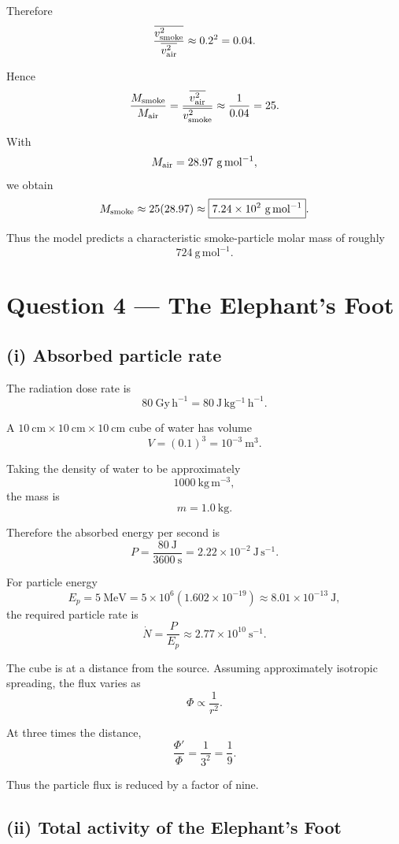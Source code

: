 \documentclass[11pt,a4paper]{article}
\begin{document}
Therefore
\[
\frac{\overline{v_{\rm smoke}^2}}
{\overline{v_{\rm air}^2}}
\approx0.2^2=0.04.
\]

Hence
\[
\frac{M_{\rm smoke}}{M_{\rm air}}
=
\frac{\overline{v_{\rm air}^2}}
{\overline{v_{\rm smoke}^2}}
\approx\frac1{0.04}=25.
\]

With
\[
M_{\rm air}=28.97\ \mathrm{g\,mol^{-1}},
\]
we obtain
\[
M_{\rm smoke}
\approx
25(28.97)
\approx
\boxed{7.24\times10^2\ \mathrm{g\,mol^{-1}}}.
\]

Thus the model predicts a characteristic smoke-particle molar mass of roughly
\[
\boxed{724\ \mathrm{g\,mol^{-1}}}.
\]

\section{Question 4 --- The Elephant's Foot}

\subsection{(i) Absorbed particle rate}

The radiation dose rate is
\[
80\ \mathrm{Gy\,h^{-1}}
=
80\ \mathrm{J\,kg^{-1}\,h^{-1}}.
\]

A $10\ \mathrm{cm}\times10\ \mathrm{cm}\times10\ \mathrm{cm}$ cube of water has
volume
\[
V=(0.1)^3=10^{-3}\ \mathrm{m^3}.
\]

Taking the density of water to be approximately
\[
1000\ \mathrm{kg\,m^{-3}},
\]
the mass is
\[
m=1.0\ \mathrm{kg}.
\]

Therefore the absorbed energy per second is
\[
P
=
\frac{80\ \mathrm J}{3600\ \mathrm s}
=
2.22\times10^{-2}\ \mathrm{J\,s^{-1}}.
\]

For particle energy
\[
E_p=5\ \mathrm{MeV}
=
5\times10^6(1.602\times10^{-19})
\approx
8.01\times10^{-13}\ \mathrm J,
\]
the required particle rate is
\[
\dot N
=
\frac{P}{E_p}
\approx
\boxed{2.77\times10^{10}\ \mathrm{s^{-1}}}.
\]

The cube is at a distance from the source. Assuming approximately isotropic
spreading, the flux varies as
\[
\Phi\propto\frac1{r^2}.
\]

At three times the distance,
\[
\frac{\Phi'}{\Phi}
=
\frac1{3^2}
=
\boxed{\frac19}.
\]

Thus the particle flux is reduced by a factor of nine.

\subsection{(ii) Total activity of the Elephant's Foot}
\end{document}
